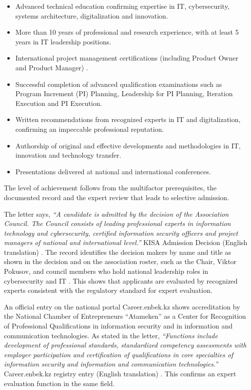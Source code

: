 \vspace{-0.5\baselineskip}
\begin{itemize}[nosep]
\item Advanced technical education confirming expertise in IT, cybersecurity, systems architecture, digitalization and innovation.
\item More than 10 years of professional and research experience, with at least 5 years in IT leadership positions.
\item International project management certifications (including Product Owner and Product Manager) .
\item Successful completion of advanced qualification examinations such as Program Increment (PI) Planning, Leadership for PI Planning, Iteration Execution and PI Execution.
\item Written recommendations from recognized experts in IT and digitalization, confirming an impeccable professional reputation.
\item Authorship of original and effective developments and methodologies in IT, innovation and technology transfer.
\item Presentations delivered at national and international conferences.
\end{itemize}

The level of achievement follows from the multifactor prerequisites, the documented record and the expert review that leads to selective admission.

The letter says, \emph{``A candidate is admitted by the decision of the Association Council. The Council consists of leading professional experts in information technology and cybersecurity, certified information security officers and project managers of national and international level.''} KISA Admission Decision (English translation) . The record identifies the decision makers by name and title as shown in the decision and on the association roster, such as the Chair, Viktor Pokusov, and council members who hold national leadership roles in cybersecurity and IT . This shows that applicants are evaluated by recognized experts consistent with the regulatory standard for expert evaluation.

An official entry on the national portal Career.enbek.kz shows accreditation by the National Chamber of Entrepreneurs ``Atameken'' as a Center for Recognition of Professional Qualifications in information security and in information and communication technologies. As stated in the letter, \emph{``Functions include development of professional standards, standardized competency assessments with employer participation and certification of qualifications in core specialties of information security and information and communication technologies.''} Career.enbek.kz registry entry (English translation) . This confirms an expert evaluation function in the same field.


